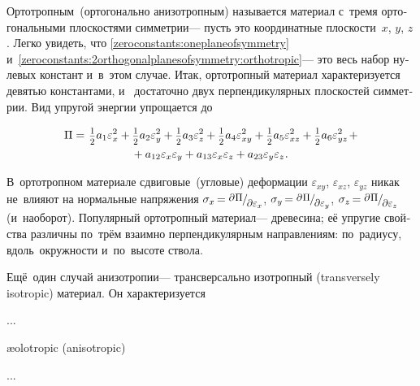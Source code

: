 \begin{otherlanguage}{russian}
Ортотропным~(ортогонально анизотропным) называется материал с~тремя ортогональными плоскостями симметрии\:--- пусть это координатные плоскости~$x$, $y$, $z$. Легко увидеть, что \eqref{zeroconstants:oneplaneofsymmetry} и~\eqref{zeroconstants:2orthogonalplanesofsymmetry:orthotropic}\:--- это весь набор нулевых констант и~в~этом случае. Итак, ортотропный материал характеризуется девятью константами, и~ достаточно двух перпендикулярных плоскостей симметрии. Вид упругой энергии упрощается до

\nopagebreak\vspace{-0.25em}\begin{multline*}
\Pi =^{\mathstrut^{\mathstrut}} \smalldisplaystyleonehalf a_1 \varepsilon^2_{x} + \smalldisplaystyleonehalf a_2 \varepsilon^2_{y} + \smalldisplaystyleonehalf a_3 \varepsilon^2_{z} + \smalldisplaystyleonehalf a_4 \varepsilon^2_{xy} + \smalldisplaystyleonehalf a_5 \varepsilon^2_{xz} + \smalldisplaystyleonehalf a_6 \varepsilon^2_{yz} \hspace{0.25ex} + \\[-0.1em]
%
+ \hspace{0.5ex} a_{12} \varepsilon_{x} \varepsilon_{y} + a_{13} \varepsilon_{x} \varepsilon_{z} + a_{23} \varepsilon_{y} \varepsilon_{z} \hspace{0.1ex} .
\end{multline*}

В~ортотропном материале сдвиговые~(угловые) деформации $\varepsilon_{xy}$, $\varepsilon_{xz}$, $\varepsilon_{yz}$ никак не~влияют на нормальные напряжения ${\sigma_x \hspace{-0.25ex} = \raisemath{0.16em}{\scalebox{0.88}{$\partial \hspace{0.1ex} \Pi$}} \hspace{-0.1ex} / \hspace{-0.2ex} \raisemath{-0.32em}{\scalebox{0.88}{$\partial \varepsilon_x$}}}$, ${\sigma_y \hspace{-0.25ex} = \raisemath{0.16em}{\scalebox{0.88}{$\partial \hspace{0.1ex} \Pi$}} \hspace{-0.1ex} / \hspace{-0.2ex} \raisemath{-0.32em}{\scalebox{0.88}{$\partial \varepsilon_y$}}}$, ${\sigma_z \hspace{-0.25ex} = \raisemath{0.16em}{\scalebox{0.88}{$\partial \hspace{0.1ex} \Pi$}} \hspace{-0.1ex} / \hspace{-0.2ex} \raisemath{-0.32em}{\scalebox{0.88}{$\partial \varepsilon_z$}}}$ (и~наоборот). Популярный ортотропный материал\:--- древесина; её упругие свойства различны по~трём взаимно перпендикулярным направлениям: по~радиусу, вдоль~окружности и~по~высоте ствола.

Ещё~один случай анизотропии\:--- трансверсально изотропный (transversely isotropic) материал. Он характеризуется

...

æolotropic (anisotropic)

...


\end{otherlanguage}

